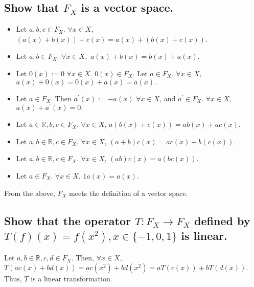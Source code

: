 \documentclass[11pt]{article} %
\begin{document}
\subsection{Show that $F_X$ is a vector space.}
\begin{itemize}
\item
Let $a,b,c \in F_X$. $\forall x \in X,$ $(a(x) + b(x)) +c(x) = a(x) + (b(x) +c(x))$.
\item
Let $a,b \in F_X$. $\forall x \in X,$ $a(x) + b(x) =  b(x) + a(x)$. 
\item
Let $0(x):= 0$  $\forall x \in X$. $0(x) \in F_X.$ Let $a \in F_X$.  $\forall x \in X,$ $a(x) + 0(x) = 0(x) + a(x) = a(x).$
\item
Let $a \in F_X$. Then $a^{'}(x):= -a(x)$ $\forall x \in X$, and $a^{'} \in F_X$.  $\forall x \in X,$  $a(x) + a^{'}(x) = 0.$
\item
Let $a \in \mathbb{R}, b,c \in F_X.$ $\forall x \in X$, $a (b(x) + c(x)) = ab(x) + ac(x).$
\item
Let $a,b \in \mathbb{R}, c \in F_X.$ $\forall x \in X$, $(a+b)c(x) = ac(x) + b(c(x)).$
\item
Let $a,b \in \mathbb{R}, c \in F_X.$ $\forall x \in X$, $(ab)c(x) = a(bc(x)).$
\item
Let $a \in F_X$. $\forall x \in X$, $1 a(x) = a(x)$.
\end{itemize}
From the above, $F_X$ meets the definition of a vector space.
\subsection{Show that the operator $T: F_X \rightarrow F_X$ defined by $T(f)(x) = f(x^2), x \in \{ -1,0,1\}$ is linear.}
Let $a,b \in \mathbb{R}, c,d \in F_X.$ Then, $\forall x \in X,$ $T(ac(x) + bd(x)) = ac(x^2) + bd(x^2) = aT(c(x)) + bT(d(x)).$ Thus, $T$ is a linear transformation.
\end{document}
